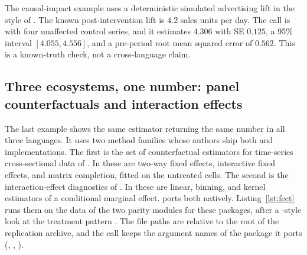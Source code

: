 The causal-impact example uses a deterministic simulated advertising lift
in the style of \citet{brodersen2015inferring}. The known post-intervention
lift is \(4.2\) sales units per day. The call is
 with four unaffected control series, and it estimates
\(4.306\) with SE \(0.125\), a 95\% interval \([4.055,4.556]\), and a
pre-period root mean squared error of \(0.562\). This is a known-truth check,
not a cross-language claim.

\subsection{Three ecosystems, one number: panel counterfactuals and interaction effects}\label{sec:ex-fect}

The last example shows the same estimator returning the same number in
all three languages. It uses two method families whose authors ship
both  and  implementations. The first is the
set of counterfactual estimators for time-series cross-sectional data of
\citet{liu2024practical}. In  these are two-way fixed effects,
interactive fixed effects, and matrix completion, fitted on the
untreated cells. The second is the interaction-effect diagnostics of
\citet{hainmueller2019much}. In  these are linear,
binning, and kernel estimators of a conditional marginal effect.
\statspai{} ports both natively. Listing~\ref{lst:fect} runs them on the
data of the two parity modules for these packages, after a -style look at the
treatment pattern \citep{mou2023panel}. The file paths are relative to
the root of the replication archive, and the  call
keeps the argument names of the package it ports (, ,
).

